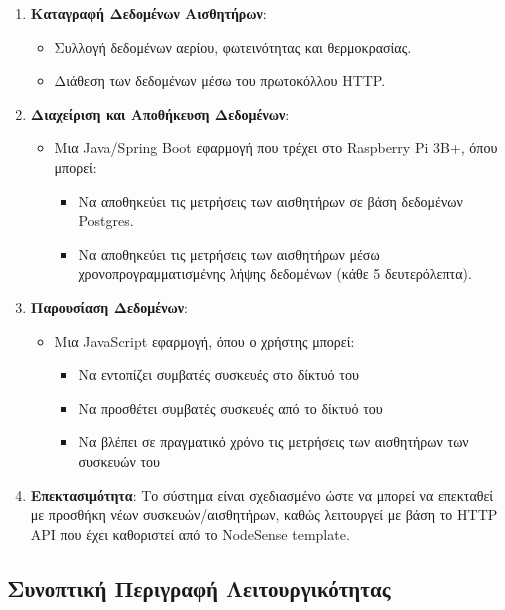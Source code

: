 \documentclass[conference]{IEEEtran}
\begin{document}
\begin{enumerate}
	\item \textbf{Καταγραφή Δεδομένων Αισθητήρων}:  
	      \begin{itemize}
	      	\item Συλλογή δεδομένων αερίου, φωτεινότητας και θερμοκρασίας.
	      	\item Διάθεση των δεδομένων μέσω του πρωτοκόλλου HTTP.
	      \end{itemize}
	      	      
	\item \textbf{Διαχείριση και Αποθήκευση Δεδομένων}:  
	      \begin{itemize}
	      	\item Μια Java/Spring Boot εφαρμογή που τρέχει στο Raspberry Pi 3B+, όπου μπορεί:
	      	      \begin{itemize}
	      	      	\item Να αποθηκεύει τις μετρήσεις των αισθητήρων σε βάση δεδομένων Postgres. 
	      	      	\item Να αποθηκεύει τις μετρήσεις των αισθητήρων μέσω χρονοπρογραμματισμένης λήψης δεδομένων (κάθε 5 δευτερόλεπτα).
	      	      \end{itemize}
	      \end{itemize}
	      	      
	\item \textbf{Παρουσίαση Δεδομένων}:  
	      \begin{itemize}
	      	\item Μια JavaScript εφαρμογή, όπου ο χρήστης μπορεί:
	      	      \begin{itemize}
	      	      	\item Να εντοπίζει συμβατές συσκευές στο δίκτυό του
	      	      	\item Να προσθέτει συμβατές συσκευές από το δίκτυό του
	      	      	\item Να βλέπει σε πραγματικό χρόνο τις μετρήσεις των αισθητήρων των συσκευών του
	      	      \end{itemize}
	      \end{itemize}
	      	      
	\item \textbf{Επεκτασιμότητα}:  
	      Το σύστημα είναι σχεδιασμένο ώστε να μπορεί να επεκταθεί με προσθήκη νέων συσκευών/αισθητήρων, καθώς λειτουργεί με βάση το HTTP API που έχει καθοριστεί από το NodeSense template.
\end{enumerate}

\subsection{Συνοπτική Περιγραφή Λειτουργικότητας}
\end{document}
